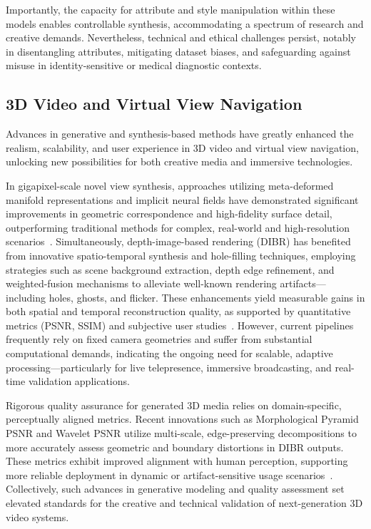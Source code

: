 Importantly, the capacity for attribute and style manipulation within these models enables controllable synthesis, accommodating a spectrum of research and creative demands. Nevertheless, technical and ethical challenges persist, notably in disentangling attributes, mitigating dataset biases, and safeguarding against misuse in identity-sensitive or medical diagnostic contexts.

\subsection{3D Video and Virtual View Navigation}

Advances in generative and synthesis-based methods have greatly enhanced the realism, scalability, and user experience in 3D video and virtual view navigation, unlocking new possibilities for both creative media and immersive technologies.

In gigapixel-scale novel view synthesis, approaches utilizing meta-deformed manifold representations and implicit neural fields have demonstrated significant improvements in geometric correspondence and high-fidelity surface detail, outperforming traditional methods for complex, real-world and high-resolution scenarios~\cite{ref98}. Simultaneously, depth-image-based rendering (DIBR) has benefited from innovative spatio-temporal synthesis and hole-filling techniques, employing strategies such as scene background extraction, depth edge refinement, and weighted-fusion mechanisms to alleviate well-known rendering artifacts—including holes, ghosts, and flicker. These enhancements yield measurable gains in both spatial and temporal reconstruction quality, as supported by quantitative metrics (PSNR, SSIM) and subjective user studies~\cite{ref99}. However, current pipelines frequently rely on fixed camera geometries and suffer from substantial computational demands, indicating the ongoing need for scalable, adaptive processing—particularly for live telepresence, immersive broadcasting, and real-time validation applications.

Rigorous quality assurance for generated 3D media relies on domain-specific, perceptually aligned metrics. Recent innovations such as Morphological Pyramid PSNR and Wavelet PSNR utilize multi-scale, edge-preserving decompositions to more accurately assess geometric and boundary distortions in DIBR outputs. These metrics exhibit improved alignment with human perception, supporting more reliable deployment in dynamic or artifact-sensitive usage scenarios~\cite{ref99}. Collectively, such advances in generative modeling and quality assessment set elevated standards for the creative and technical validation of next-generation 3D video systems.


